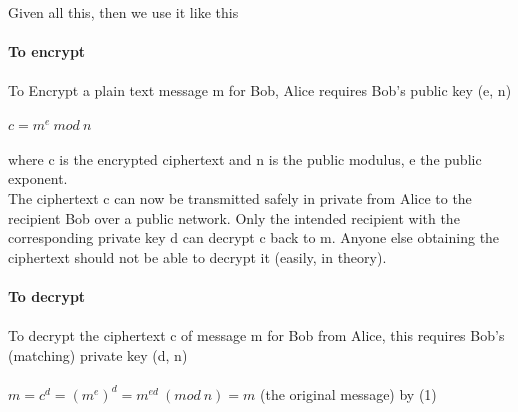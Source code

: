 \documentclass[11pt]{article}   	%
\begin{document}
\\
Given all this, then we use it like this \\
\\
\textbf{To encrypt} \\
\\
To Encrypt a plain text message m for Bob, Alice requires Bob's public key (e, n) \\
\\
$ c = m^e \ mod \ n $ \\
\\
where c is the encrypted ciphertext and n is the public modulus, e the public exponent.
\\
The ciphertext c can now be transmitted safely in private from Alice to the recipient Bob over a public network. Only the intended recipient with the corresponding private key d can decrypt c back to m. Anyone else obtaining the ciphertext should not be able to decrypt it (easily, in theory). \\
\\
\textbf{To decrypt} \\
\\
To decrypt the ciphertext c of message m for Bob from Alice, this requires Bob's (matching) private key (d, n) \\
\\
$ m = c^d = (m^e)^d = m^{ed} \ (mod \ n) = m$ (the original message) by (1) \\

\break 
\end{document}
